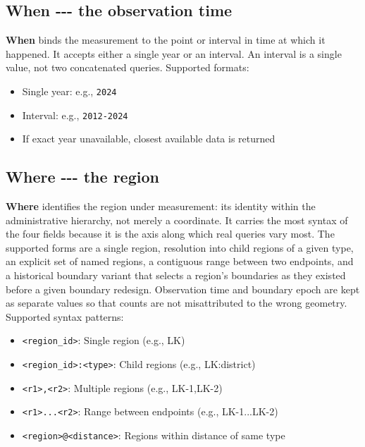 \documentclass[10pt,a4paper]{article}%
\begin{document}
\subsection{When {-}{-}{-} the observation time}%
\label{subsec:When{-}{-}{-}theobservationtime}%
\textbf{When} binds the measurement to the point or interval in time at which it happened. It accepts either a single year or an interval. An interval is a single value, not two concatenated queries.%
Supported formats:%
\begin{itemize}%
\item%
Single year: e.g., \texttt{2024}%
\item%
Interval: e.g., \texttt{2012-2024}%
\item%
If exact year unavailable, closest available data is returned%
\end{itemize}

%
\subsection{Where {-}{-}{-} the region}%
\label{subsec:Where{-}{-}{-}theregion}%
\textbf{Where} identifies the region under measurement: its identity within the administrative hierarchy, not merely a coordinate. It carries the most syntax of the four fields because it is the axis along which real queries vary most. The supported forms are a single region, resolution into child regions of a given type, an explicit set of named regions, a contiguous range between two endpoints, and a historical boundary variant that selects a region's boundaries as they existed before a given boundary redesign. Observation time and boundary epoch are kept as separate values so that counts are not misattributed to the wrong geometry.%
Supported syntax patterns:%
\begin{itemize}%
\item%
\texttt{<region\_id>}: Single region (e.g., LK)%
\item%
\texttt{<region\_id>:<type>}: Child regions (e.g., LK:district)%
\item%
\texttt{<r1>,<r2>}: Multiple regions (e.g., LK-1,LK-2)%
\item%
\texttt{<r1>...<r2>}: Range between endpoints (e.g., LK-1...LK-2)%
\item%
\texttt{<region>@<distance>}: Regions within distance of same type%
\end{itemize}

%
\end{document}

